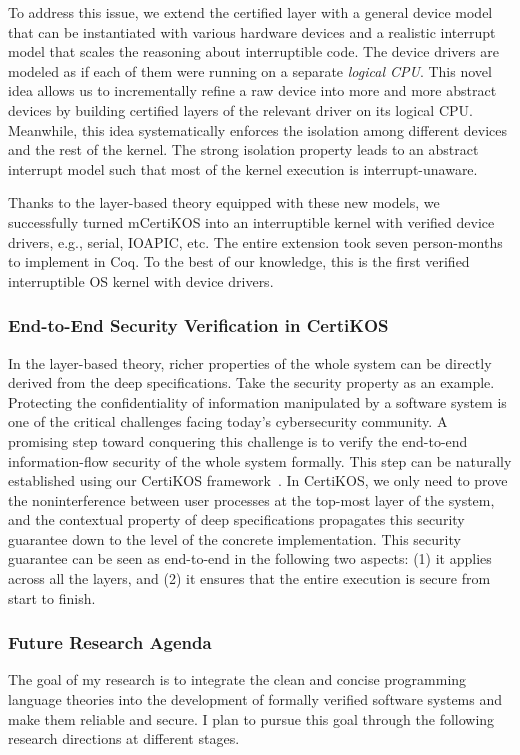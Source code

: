 \documentclass[a4paper, 10pt]{article}
\begin{document}
\begin{small}
To address this issue, we extend the certified layer with
a general device model that can be
instantiated with various hardware devices and a realistic
interrupt model that scales the reasoning
about interruptible code. 
The device drivers are modeled
as if each of them were running on a  separate \emph{logical CPU}. This novel idea allows us to
incrementally refine a raw
device into more and more abstract devices
by building certified layers of the relevant driver on its logical CPU.
Meanwhile, this idea systematically enforces
the isolation among different devices and the
rest of the kernel. The strong isolation property 
leads to an abstract interrupt model such that
most of the kernel execution is interrupt-unaware.

Thanks to the layer-based theory equipped with these new models,
we successfully turned mCertiKOS
into an  interruptible kernel with verified  device
drivers, e.g., serial, IOAPIC, etc. 
The entire extension  took  seven person-months
to implement in Coq.
To the best of our knowledge, this is the first verified
interruptible OS kernel with device drivers.

\subsubsection*{\small End-to-End Security Verification in CertiKOS}
In the layer-based theory, richer properties of the whole system can be
directly derived  from the deep specifications.
Take the security property as an example.
Protecting the confidentiality of information manipulated by
a software system is one of the critical challenges
facing today's cybersecurity community. A promising step
toward conquering this challenge is to  verify  the
end-to-end information-flow
security of the whole system formally. 
This step can be naturally established
using our CertiKOS framework~\cite{pldi16-security}. In CertiKOS, we only need to prove the noninterference between user processes 
 at the top-most layer of the system, and the contextual property of deep specifications propagates
this security guarantee down to the level of the concrete implementation.
This security guarantee
can be seen as end-to-end in the following two aspects: (1)
it applies across all the layers, and (2) it ensures that the entire
execution is secure from start to finish.

\subsubsection*{\large Future Research Agenda}
The goal of my research is to
integrate the clean and concise programming language theories
into the development of formally verified software systems 
and make them reliable and secure.
I plan to pursue this goal through the following research directions at different stages.



\end{small}
\end{document}
